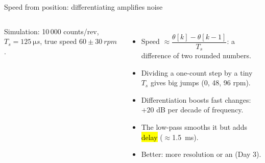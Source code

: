 \documentclass[aspectratio=169,10pt]{beamer}
\newcommand{\dat}[1]{data/#1.dat}
\begin{document}
\begin{frame}{Speed from position: differentiating amplifies noise}
\begin{columns}[T]
\centering
{}
{\scriptsize\color{mkGray} Simulation: 10\,000 counts/rev, $T_s=\SI{125}{\micro s}$, true speed $60\pm\SI{30}{rpm}$.}
\begin{itemize}\small
\item Speed $\approx\dfrac{\theta[k]-\theta[k-1]}{T_s}$: a difference of two rounded numbers.
\item Dividing a one-count step by a tiny $T_s$ gives big jumps (0, 48, 96 rpm).
\item Differentiation boosts fast changes: $+20$ dB per decade of frequency.
\item The low-pass smooths it but adds \hl{delay} ($\approx$\SI{1.5}{ms}).
\item Better: more resolution or an  (Day 3).
\end{itemize}
\end{columns}
\end{frame}
\end{document}
